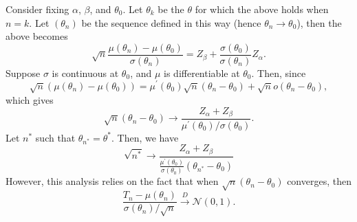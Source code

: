 \begin{intuition}

\end{intuition}

Consider fixing \(\alpha \), \(\beta \), and \(\theta _0\). Let \(\theta _k\) be the \(\theta \) for which the above holds when \(n = k\). Let \((\theta _n)\) be the sequence defined in this way (hence \(\theta _n \to \theta _0\)), then the above becomes
\[
	\sqrt{n} \frac{\mu (\theta _n) - \mu (\theta _0)}{\sigma (\theta _n)} = Z_\beta + \frac{\sigma (\theta _0)}{\sigma (\theta _n)} Z_\alpha.
\]
Suppose \(\sigma \) is continuous at \(\theta _0\), and \(\mu \) is differentiable at \(\theta _0\). Then, since
\[
	\sqrt{n} (\mu (\theta _n) - \mu (\theta _0))
	= \mu ^{\prime} (\theta _0) \sqrt{n} (\theta _n - \theta _0) + \sqrt{n} o(\theta _n - \theta _0),
\]
which gives
\[
	\sqrt{n} (\theta _n - \theta _0)
	\to \frac{Z_\alpha + Z_\beta }{\mu ^{\prime} (\theta _0) / \sigma (\theta _0)}.
\]
Let \(n^{\ast} \) such that \(\theta _{n^{\ast} } = \theta ^{\ast} \). Then, we have
\[
	\sqrt{n^{\ast} }
	\to \frac{Z_\alpha + Z_\beta }{\frac{\mu ^{\prime} (\theta _0)}{\sigma (\theta _0)} (\theta _{n^{\ast} } - \theta _0)}
\]
However, this analysis relies on the fact that when \(\sqrt{n} (\theta _n - \theta _0)\) converges, then
\[
	\frac{T_n - \mu (\theta _n)}{\sigma (\theta _n) / \sqrt{n} } \overset{D}{\to} \mathcal{N} (0, 1).
\]